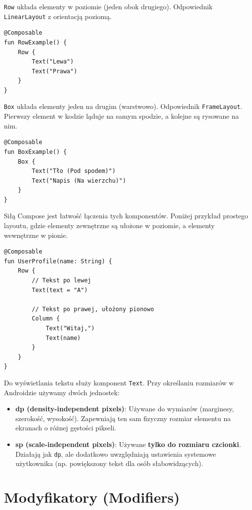 \texttt{Row} układa elementy w poziomie (jeden obok drugiego). Odpowiednik \texttt{LinearLayout} z orientacją poziomą.

\begin{verbatim}
@Composable
fun RowExample() {
    Row {
        Text("Lewa")
        Text("Prawa")
    }
}
\end{verbatim}

\texttt{Box} układa elementy jeden na drugim (warstwowo). Odpowiednik \texttt{FrameLayout}. Pierwszy element w kodzie ląduje na samym spodzie, a kolejne są rysowane na nim.

\begin{verbatim}
@Composable
fun BoxExample() {
    Box {
        Text("Tło (Pod spodem)")
        Text("Napis (Na wierzchu)")
    }
}
\end{verbatim}

Siłą Compose jest łatwość łączenia tych komponentów. Poniżej przykład prostego layoutu, gdzie elementy zewnętrzne są ułożone w poziomie, a elementy wewnętrzne w pionie.

\begin{verbatim}
@Composable
fun UserProfile(name: String) {
    Row {
        // Tekst po lewej
        Text(text = "A") 
        
        // Tekst po prawej, ułożony pionowo
        Column {
            Text("Witaj,")
            Text(name)
        }
    }
}
\end{verbatim}

Do wyświetlania tekstu służy komponent \texttt{Text}. Przy określaniu rozmiarów w Androidzie używamy dwóch jednostek:

\begin{itemize}
    \item \textbf{dp (density-independent pixels)}: Używane do wymiarów (marginesy, szerokość, wysokość). Zapewniają ten sam fizyczny rozmiar elementu na ekranach o różnej gęstości pikseli.
    \item \textbf{sp (scale-independent pixels)}: Używane \textbf{tylko do rozmiaru czcionki}. Działają jak \texttt{dp}, ale dodatkowo uwzględniają ustawienia systemowe użytkownika (np. powiększony tekst dla osób słabowidzących).
\end{itemize}

\section{Modyfikatory (Modifiers)}

